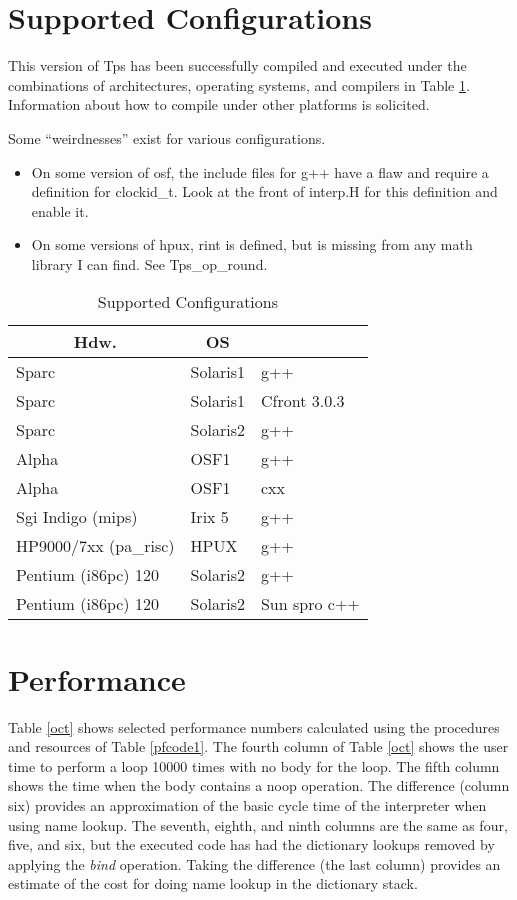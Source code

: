\section{Supported Configurations}
This version of Tps has been successfully compiled and executed
under the combinations of architectures, operating systems,
and compilers in Table \ref{instances}.
Information about how to compile under other platforms
is solicited.

Some ``weirdnesses'' exist for various configurations.
\begin{itemize}
\item On some version of osf, the include files for g++
have a flaw and require a definition for clockid\_t.
Look at the front of interp.H for this definition and enable it.
\item On some versions of hpux, rint is defined, but is missing
from any math library I can find.  See Tps\_op\_round.
\end{itemize}

\begin{table}[h]\centering
\begin{tabular}{|l|l|l|}
\hline
\multicolumn{1}{|c}{Hdw.} &
\multicolumn{1}{|c}{OS} &
\multicolumn{1}{|c|}{\CC{}} \\ \hline\hline
Sparc & Solaris1 & g++ \\ \hline
Sparc & Solaris1 & Cfront 3.0.3 \\ \hline
Sparc & Solaris2 & g++ \\ \hline
Alpha & OSF1 & g++ \\ \hline
Alpha & OSF1 & cxx \\ \hline
Sgi Indigo (mips) & Irix 5 & g++ \\ \hline
HP9000/7xx (pa\_risc) & HPUX & g++ \\ \hline
Pentium (i86pc) 120 & Solaris2 & g++ \\ \hline
Pentium (i86pc) 120 & Solaris2 & Sun spro c++ \\ \hline
\end{tabular}
\caption{Supported Configurations}
\label{instances}
\end{table}

\newpage
\section{Performance}
Table \ref{oct} shows selected performance numbers
calculated using the procedures and resources of
Table \ref{pfcode1}.
The fourth column of Table \ref{oct} shows the user time to perform a loop
10000 times with no body for the loop.
The fifth column shows the time when the body contains a noop operation.
The difference (column six) provides an approximation of the basic cycle
time of the interpreter when using name lookup.
The seventh, eighth, and ninth columns are the same as four, five, and six,
but the executed code has had the dictionary lookups removed
by applying the {\em bind} operation.
Taking the difference (the last column) provides an estimate of the cost
for doing name lookup in the dictionary stack.

